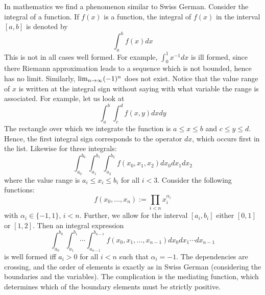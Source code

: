 In mathematics we find a phenomenon similar to Swiss German.
Consider the integral of a function. If $f(x)$ is a function,
the integral of $f(x)$ in the interval $[a,b]$ is denoted by
\begin{equation}
\int_{a}^{b} f(x)dx
\end{equation}
This is not in all cases well formed. For example,
$\int_0^1 x^{-1}dx$ is ill formed, since there Riemann approximation
leads to a sequence which is not bounded, hence has no limit.
Similarly, $\lim_{n \rightarrow \infty} (-1)^n$ does not exist. Notice
that the value range of $x$ is written at the integral sign
without saying with what variable the range is associated.
For example, let us look at
\begin{equation}
\int_{a}^b \int_{c}^d f(x,y)dxdy
\end{equation}
The rectangle over which we integrate the function is
$a \leq x \leq b$ and $c \leq y \leq d$. Hence, the first
integral sign corresponds to the operator $dx$, which occurs
first in the list. Likewise for three integrals:
\begin{equation}
\int_{a_0}^{b_0} \int_{a_1}^{b_1} \int_{a_2}^{b_2}
f(x_0,x_1,x_2) dx_0dx_1dx_2
\end{equation}
where the value range is $a_i \leq x_i \leq b_i$ for all
$i < 3$. Consider the following functions:
\begin{equation}
f(x_0, \dotsc, x_n) := \prod_{i < n} x_i^{\alpha_i}
\end{equation}
with $\alpha_i \in \{-1,1\}$, $i < n$.
Further, we allow for the interval $[a_i,b_i]$ either
$[0,1]$ or $[1,2]$. Then an integral expression
\begin{equation}
\int_{a_0}^{b_0} \int_{a_1}^{b_1} \dotsi \int_{a_{n-1}}^{b_{n-1}}
f(x_0,x_1,\dotsc, x_{n-1}) dx_0dx_1\dotsb dx_{n-1}
\end{equation}
is well formed iff $a_i > 0$ for all
$i < n$ such that $\alpha_i = -1$. The dependencies are
crossing, and the order of elements is exactly as in Swiss
German (considering the boundaries and the variables).
The complication is the mediating function, which determines
which of the boundary elements must be strictly positive.

